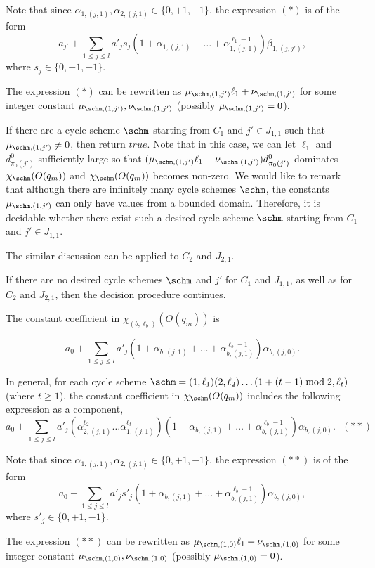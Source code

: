 Note that since $\alpha_{1,(j,1)},\alpha_{2,(j,1)} \in \{0,+1,-1\}$, the expression $(\ast)$ is of the form 
\[a_{j'} + \sum \limits_{1 \le j \le l} a'_j  s_j (1+\alpha_{1,(j,1)} + \dots +\alpha^{\ell_1-1}_{1,(j,1)})\beta_{1,(j,j')},\]
where $s_j \in \{0,+1,-1\}$.

The expression $(\ast)$ can be rewritten as $\mu_{\schm,(1,j')} \ell_1 + \nu_{\schm,(1,j')}$ for some integer constant $\mu_{\schm,(1,j')},\nu_{\schm,(1,j')}$ (possibly $\mu_{\schm,(1,j')}=0$). 

If there are a cycle scheme $\schm$ starting from $C_1$  and $j' \in J_{1,1}$ such that $\mu_{\schm,(1,j')} \neq 0$, then return $true$. Note that in this case, we can let $\ell_1$ and $d^0_{\pi_0(j')}$ sufficiently large so that $(\mu_{\schm,(1,j')} \ell_1 + \nu_{\schm,(1,j')})d^0_{\pi_0(j')}$ dominates $\chi_{\schm}(O(q_m))$ and $\chi_{\schm}(O(q_m))$ becomes non-zero. We would like to remark that although there are infinitely many cycle schemes $\schm$, the constants $\mu_{\schm,(1,j')}$ can only have values from a bounded domain. Therefore, it is decidable whether there exist such a desired cycle scheme $\schm$ starting from $C_1$ and $j' \in J_{1,1}$.

The similar discussion can be applied to $C_2$ and $J_{2,1}$.

If there are no desired cycle schemes $\schm$ and $j'$ for $C_1$ and $J_{1,1}$, as well as for  $C_2$ and $J_{2,1}$, then the decision procedure continues.

The constant coefficient in $\chi_{(b,\ell_b)}(O(q_m))$ is 

\[a_0 + \sum \limits_{1 \le j \le l} a'_j (1+\alpha_{b,(j,1)} + \dots +\alpha^{\ell_b-1}_{b,(j,1)})\alpha_{b,(j,0)}.\]

In general, for each cycle scheme $\schm=(1,\ell_1)(2,\ell_2) \dots (1+(t-1) \bmod 2,\ell_{t})$ (where $t \ge 1$), the constant coefficient in $\chi_{\schm}(O(q_m))$ includes the following expression as a component,
%
\[a_0 + \sum \limits_{1 \le j \le l} a'_j (\alpha^{\ell_2}_{2,(j,1)} \dots \alpha^{\ell_t}_{1,(j,1)}) (1+\alpha_{b,(j,1)} + \dots +\alpha^{\ell_b-1}_{b,(j,1)})\alpha_{b,(j,0)}. \ \ \  (\ast\ast)\]

Note that since $\alpha_{1,(j,1)},\alpha_{2,(j,1)} \in \{0,+1,-1\}$, the expression $(\ast\ast)$ is of the form 
\[a_0 + \sum \limits_{1 \le j \le l} a'_j  s'_j (1+\alpha_{b,(j,1)} + \dots +\alpha^{\ell_b-1}_{b,(j,1)})\alpha_{b,(j,0)},\]
where $s'_j \in \{0,+1,-1\}$.

The expression $(\ast\ast)$ can be rewritten as $\mu_{\schm,(1,0)} \ell_1 + \nu_{\schm,(1,0)}$ for some integer constant $\mu_{\schm,(1,0)},\nu_{\schm, (1,0)}$ (possibly $\mu_{\schm,(1,0)}=0$). 

